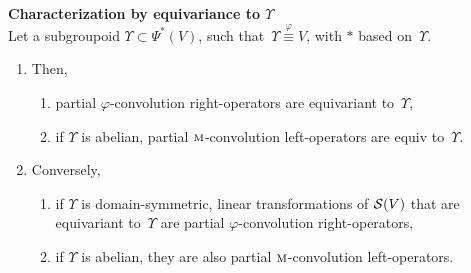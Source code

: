 \begin{theorem}\textbf{Characterization by equivariance to $\Upsilon$}\\
Let a subgroupoid $\Upsilon \subset \Psi^*(V)$, such that~$\Upsilon \overset\varphi\equiv V$, with $\ast$ based on~$\Upsilon$.
\begin{enumerate}
\item Then,
\begin{enumerate}[label=(\roman*)]
  \item partial $\varphi$-convolution right-operators are equivariant to~$\Upsilon$,\label{enum:i}
  \item if $\Upsilon$ is abelian, partial $\operatorname{\textsc{m}}$-convolution left-operators are equiv to~$\Upsilon$.\label{enum:ii}
\end{enumerate}
\item Conversely, \label{enum:2}
\begin{enumerate}[label=(\roman*)]
  \item if $\Upsilon$ is domain-symmetric, linear transformations of $\mathcal{S}(V)$ that are equivariant to~$\Upsilon$ are partial $\varphi$-convolution right-operators,
  \item if $\Upsilon$ is abelian, they are also partial $\operatorname{\textsc{m}}$-convolution left-operators.
\end{enumerate}
\end{enumerate}
\label{prop:equiP}
\end{theorem}
